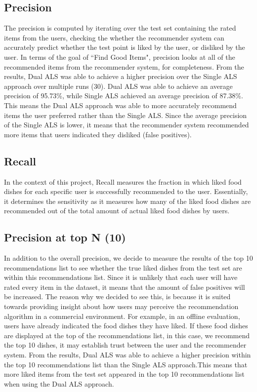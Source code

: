 \subsection{Precision}
The precision is computed by iterating over the test set containing the rated items from the users, checking the whether the recommender system can accurately predict whether the test point is liked by the user, or disliked by the user. In terms of the goal of ``Find Good Items", precision looks at all of the recommended items from the recommender system, for completeness. From the results, Dual ALS was able to achieve a higher precision over the Single ALS approach over multiple runs (30). Dual ALS was able to achieve an average precision of 95.73\%, while Single ALS achieved an average precision of 87.38\%. This means the Dual ALS approach was able to more accurately recommend items the user preferred rather than the Single ALS. Since the average precision of the Single ALS is lower, it means that the recommender system recommended more items that users indicated they disliked (false positives).

\subsection{Recall}
In the context of this project, Recall measures the fraction in which liked food dishes for each specific user is successfully recommended to the user. Essentially, it determines the sensitivity as it measures how many of the liked food dishes are recommended out of the total amount of actual liked food dishes by users.  

\subsection{Precision at top N (10)}
In addition to the overall precision, we decide to measure the results of the top 10 recommendations list to see whether the true liked dishes from the test set are within this recommendations list. Since it is unlikely that each user will have rated every item in the dataset, it means that the amount of false positives will be increased. The reason why we decided to see this, is because it is suited towards providing insight about how users may perceive the recommendation algorithm in a commercial environment. For example, in an offline evaluation, users have already indicated the food dishes they have liked. If these food dishes are displayed at the top of the recommendations list, in this case, we recommend the top 10 dishes, it may establish trust between the user and the recommender system. From the results, Dual ALS was able to achieve a higher precision within the top 10 recommendations list than the Single ALS approach.This means that more liked items from the test set appeared in the top 10 recommendations list when using the Dual ALS approach.    

